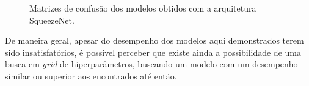 \begin{figure}[h]
    \centering
    \caption{Matrizes de confusão dos modelos obtidos com a arquitetura SqueezeNet.}\label{fig:matrizes-squeezenet}
    \hfill
\end{figure}

De maneira geral, apesar do desempenho dos modelos aqui demonstrados terem sido insatisfatórios, é possível perceber que existe ainda a possibilidade de uma busca em \emph{grid} de hiperparâmetros, buscando um modelo com um desempenho similar ou superior aos encontrados até então.